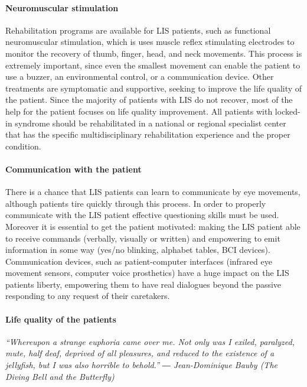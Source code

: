 \documentclass[letterpaper,10pt]{article}
\begin{document}
\paragraph{Neuromuscular stimulation}

Rehabilitation programs are available for LIS patients, such as functional neuromuscular stimulation, which is uses muscle reflex stimulating electrodes to monitor the recovery of thumb, finger, head, and neck movements. This process is extremely important, since even the smallest movement can enable the patient to use a buzzer, an environmental control, or a communication device. Other treatments are symptomatic and supportive, seeking to improve the life quality of the patient. \cite{brainfacts} Since the majority of patients with LIS do not recover, most of the help for the patient focuses on life quality improvement. All patients with locked-in syndrome should be rehabilitated in a national or regional specialist center that has the specific multidisciplinary rehabilitation experience  and the proper condition. \cite{smith_delargy_2005} 

\paragraph{Communication with the patient}

There is a chance that LIS patients can learn to communicate by eye movements, although patients tire quickly through this process.\cite{smith_delargy_2005} In order to properly communicate with the LIS patient effective questioning skills must be used. Moreover it is essential to get the patient motivated: making the LIS patient able to receive commands (verbally, visually or written) and empowering to emit information in some way (yes/no blinking, alphabet tables, BCI devices). \cite{locked_laureys} Communication devices, such as patient-computer interfaces (infrared eye movement sensors, computer voice prosthetics) have a huge impact on the LIS patients liberty, empowering them to have real dialogues beyond the passive responding to any request of their caretakers. \cite{rousseau} 


\paragraph{Life quality of the patients}
\begin{tightcenter}
\textit{“Whereupon a strange euphoria came over me. Not only was I exiled, paralyzed, mute, half deaf, deprived of all pleasures, and reduced to the existence of a jellyfish, but I was also horrible to behold.”}
\newline
\textit{― Jean-Dominique Bauby (The Diving Bell and the Butterfly)}
\end{tightcenter}
\end{document}
